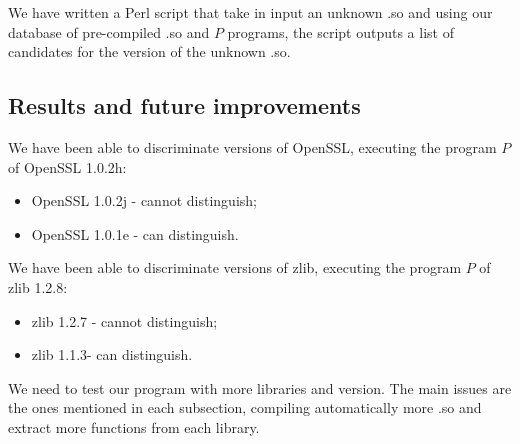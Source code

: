 \documentclass{article}
\begin{document}
   		We have written a Perl script that take in input an unknown .so and using our database of pre-compiled .so and $P$ programs, the script outputs a list of candidates for the version of the unknown .so.

   	
   	\subsection{Results and future improvements}
   	
   		We have been able to discriminate versions of OpenSSL, executing the program $P$ of OpenSSL 1.0.2h:

        \begin{itemize}
            \item OpenSSL 1.0.2j - cannot distinguish; 
            \item OpenSSL 1.0.1e - can distinguish.
        \end{itemize}


   		We have been able to discriminate versions of zlib, executing the program $P$ of zlib 1.2.8:
        \begin{itemize}
            \item zlib 1.2.7 - cannot distinguish; 
            \item zlib 1.1.3- can distinguish.
        \end{itemize}


   	
	   	We need to test our program with more libraries and version. The main issues are the ones mentioned in each subsection, compiling automatically more .so and extract more functions from each library.

    
    

\iffalse    
    \subsection{Other tools}

		\subsubsection{Coccinelle} 
			Coccinelle uses static analysis to find pattern in C source code. Using a known bug as a pattern leads to discover if the patch was applied or not. It seems not to be interesting in our case, because we deal with binaries.
		\subsubsection{n-gram}
\fi
\end{document}
